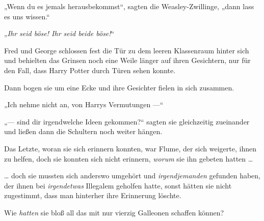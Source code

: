 „Wenn du es jemals herausbekommst“, sagten die Weasley-Zwillinge, „dann lass es uns wissen.“

„\emph{Ihr seid böse! Ihr seid beide böse!}“

Fred und George schlossen fest die Tür zu dem leeren Klassenraum hinter sich und behielten das Grinsen noch eine Weile länger auf ihren Gesichtern, nur für den Fall, dass Harry Potter durch Türen sehen konnte.

Dann bogen sie um eine Ecke und ihre Gesichter fielen in sich zusammen.

„Ich nehme nicht an, von Harrys Vermutungen —“

„— sind dir irgendwelche Ideen gekommen?“ sagten sie gleichzeitig zueinander und ließen dann die Schultern noch weiter hängen.

Das Letzte, woran sie sich erinnern konnten, war Flume, der sich weigerte, ihnen zu helfen, doch sie konnten sich nicht erinnern, \emph{worum} sie ihn gebeten hatten …

… doch sie mussten sich anderswo umgehört und \emph{irgendjemanden} gefunden haben, der ihnen bei \emph{irgendetwas} Illegalem geholfen hatte, sonst hätten sie nicht zugestimmt, dass man hinterher ihre Erinnerung löschte.

Wie \emph{hatten} sie bloß all das mit nur vierzig Galleonen schaffen können?

